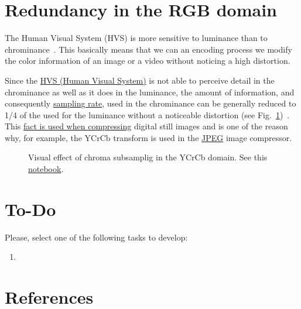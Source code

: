 \section{Redundancy in the RGB domain}

The Human Visual System (HVS) is more sensitive to luminance than to
chrominance~\cite{vruiz__visual_redundancy}. This basically means that
we can an encoding process we modify the color information of an image
or a video without noticing a high distortion.

Since the \href{https://en.wikipedia.org/wiki/Visual_system}{HVS
  (Human Visual System)} is not able to perceive detail in the
chrominance as well as it does in the luminance, the amount of
information, and consequently
\href{https://en.wikipedia.org/wiki/Sampling_(signal_processing)}{sampling
  rate}, used in the chrominance can be generally reduced to 1/4 of
the used for the luminance without a noticeable distortion (see
Fig.~\ref{fig:san-diego_chroma_subsampled})~\cite{burger2016digital}. This
\href{https://en.wikipedia.org/wiki/Bandwidth_(computing)}{fact is
  used when compressing} digital still images and is one of the reason
why, for example, the $\text{YCrCb}$ transform is used in the
\href{https://en.wikipedia.org/wiki/JPEG}{JPEG} image compressor.


\begin{figure}
  \centering
  \caption{Visual effect of chroma subsamplig in the YCrCb domain. See
    this
    \href{https://github.com/Sistemas-Multimedia/Sistemas-Multimedia.github.io/blob/master/milestones/06-YUV_compression/chroma_subsampling.ipynb}{notebook}.}
  \label{fig:san-diego_chroma_subsampled}
\end{figure}


\section{To-Do}
Please, select one of the following tasks to develop:
\begin{enumerate}
\item
\end{enumerate}

\section{References}

\renewcommand{\addcontentsline}[3]{}%


